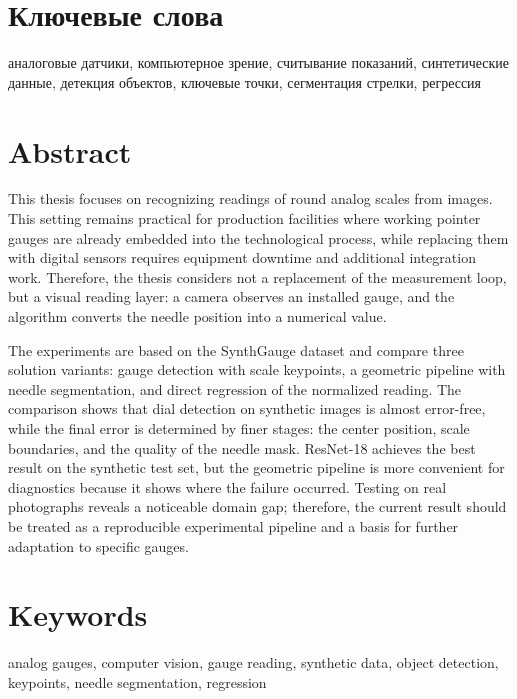 \documentclass[a4paper,14pt]{extarticle}
\begin{document}

	\section*{Ключевые слова}
	\vspace{-0.7em}
	аналоговые датчики, компьютерное зрение, считывание показаний, синтетические данные, детекция объектов, ключевые точки, сегментация стрелки, регрессия


		\newpage
\section*{Abstract}
\begingroup
\fontsize{13.4}{16}\selectfont
This thesis focuses on recognizing readings of round analog scales from images. This setting remains practical for production facilities where working pointer gauges are already embedded into the technological process, while replacing them with digital sensors requires equipment downtime and additional integration work. Therefore, the thesis considers not a replacement of the measurement loop, but a visual reading layer: a camera observes an installed gauge, and the algorithm converts the needle position into a numerical value.

The experiments are based on the SynthGauge dataset and compare three solution variants: gauge detection with scale keypoints, a geometric pipeline with needle segmentation, and direct regression of the normalized reading. The comparison shows that dial detection on synthetic images is almost error-free, while the final error is determined by finer stages: the center position, scale boundaries, and the quality of the needle mask. ResNet-18 achieves the best result on the synthetic test set, but the geometric pipeline is more convenient for diagnostics because it shows where the failure occurred. Testing on real photographs reveals a noticeable domain gap; therefore, the current result should be treated as a reproducible experimental pipeline and a basis for further adaptation to specific gauges.
\endgroup


		\section*{Keywords}
		\vspace{-0.7em}
		analog gauges, computer vision, gauge reading, synthetic data, object detection, keypoints, needle segmentation, regression
\end{document}

